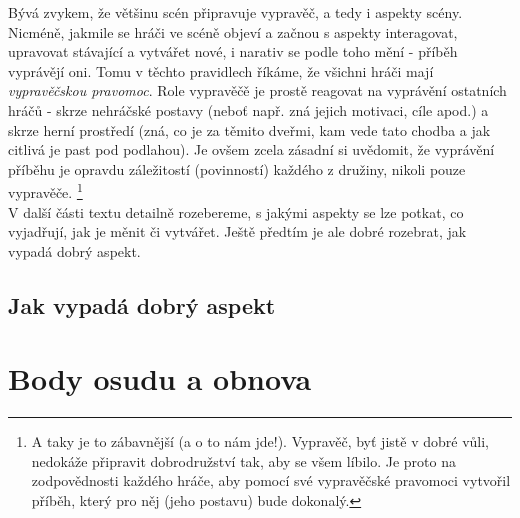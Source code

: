 \documentclass[../main.tex]{subfiles}
\begin{document}
Bývá zvykem, že většinu scén připravuje vypravěč, a tedy i aspekty scény. Nicméně, jakmile se hráči ve scéně objeví a začnou s aspekty interagovat, upravovat stávající a vytvářet nové, i narativ se podle toho mění - příběh vyprávějí oni. Tomu v těchto pravidlech říkáme, že všichni hráči mají \textit{vypravěčskou pravomoc}. Role vypravěčě je prostě reagovat na vyprávění ostatních hráčů - skrze nehráčské postavy (neboť např. zná jejich motivaci, cíle apod.) a skrze herní prostředí (zná, co je za těmito dveřmi, kam vede tato chodba a jak citlivá je past pod podlahou). Je ovšem zcela zásadní si uvědomit, že vyprávění příběhu je opravdu záležitostí (povinností) každého z družiny, nikoli pouze vypravěče. \footnote{A taky je to zábavnější (a o to nám jde!). Vypravěč, byť jistě v dobré vůli, nedokáže připravit dobrodružství tak, aby se všem líbilo. Je proto na zodpovědnosti každého hráče, aby pomocí své vypravěčské pravomoci vytvořil příběh, který pro něj (jeho postavu) bude dokonalý.} \\

V další části textu detailně rozebereme, s jakými aspekty se lze potkat, co vyjadřují, jak je měnit či vytvářet. Ještě předtím je ale dobré rozebrat, jak vypadá dobrý aspekt.

\subsection{Jak vypadá dobrý aspekt}
\label{sec:jakvypadadobry}



\section{Body osudu a obnova}
\label{sec:body-osudu-obnova}
\end{document}
